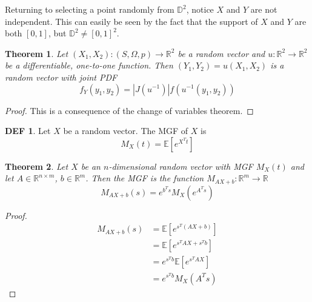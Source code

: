 \documentclass{article}
\newtheorem{theorem}{Theorem}
\theoremstyle{definition}\newtheorem{definition}{DEF}
\theoremstyle{lemma}\newtheorem{lemma}{Lemma}
\theoremstyle{corrolary}\newtheorem{corrolary}{Cor}
\begin{document}
\begin{example}
Returning to selecting a point randomly from $\mathbb{D}^2$, notice $X$ and $Y$ are not independent.
This can easily be seen by the fact that the support of $X$ and $Y$ are both $[0,1]$, but $\mathbb{D}^2\neq [0,1]^2$.
\end{example}

\begin{theorem}
Let $(X_1, X_2): (S,\Omega, p)\rightarrow \mathbb{R}^2$ be a random vector and $u: \mathbb{R}^2 \rightarrow \mathbb{R}^2$ be a differentiable, one-to-one function.
Then $(Y_1, Y_2)=u(X_1, X_2)$ is a random vector with joint PDF
\begin{equation}
f_Y(y_1, y_2) = |J(u^{-1})|f(u^{-1}(y_1, y_2))
\end{equation}
\end{theorem}
\begin{proof}
This is a consequence of the change of variables theorem.
\end{proof}

\begin{definition}
Let $X$ be a random vector.
The MGF of $X$ is
\begin{equation}
M_X(t) = \mathbb{E}[e^{X^T t}]
\end{equation}
\end{definition}

\begin{theorem}
Let $X$ be an $n$-dimensional random vector with MGF $M_X (t)$ and let $A\in \mathbb{R}^{n\times m}$, $b\in \mathbb{R}^m$.
Then the MGF is the function $M_{AX+b}:\mathbb{R}^m \rightarrow \mathbb{R}$ 
\begin{equation}
M_{AX+b}(s)=e^{b^T s}M_X(e^{A^Ts})
\end{equation}
\end{theorem}
\begin{proof}
\begin{align*}
M_{AX+b}(s)&=\mathbb{E}[e^{s^T(AX+b)}]\\
&=\mathbb{E}[e^{s^TAX+s^Tb}]\\
&=e^{s^Tb}\mathbb{E}[e^{s^TAX}]\\
&=e^{s^Tb}M_X(A^Ts)
\end{align*}
\end{proof}
\end{document}
